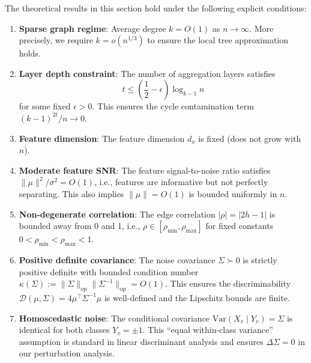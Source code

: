 \begin{assumption}
\label{ass:validity_regime}
The theoretical results in this section hold under the following explicit conditions:
\begin{enumerate}
    \item[(R1)] \textbf{Sparse graph regime}: Average degree $k = O(1)$ as $n \to \infty$. More precisely, we require $k = o(n^{1/3})$ to ensure the local tree approximation holds.

    \item[(R2)] \textbf{Layer depth constraint}: The number of aggregation layers satisfies
    \begin{equation}
        t \leq \left(\frac{1}{2} - \epsilon\right) \log_{k-1} n
    \end{equation}
    for some fixed $\epsilon > 0$. This ensures the cycle contamination term $(k-1)^{2t}/n \to 0$.

    \item[(R3)] \textbf{Feature dimension}: The feature dimension $d_x$ is fixed (does not grow with $n$).

    \item[(R4)] \textbf{Moderate feature SNR}: The feature signal-to-noise ratio satisfies $\|\mu\|^2/\sigma^2 = O(1)$, i.e., features are informative but not perfectly separating. This also implies $\|\mu\| = O(1)$ is bounded uniformly in $n$.

    \item[(R5)] \textbf{Non-degenerate correlation}: The edge correlation $|\rho| = |2h-1|$ is bounded away from 0 and 1, i.e., $\rho \in [\rho_{\min}, \rho_{\max}]$ for fixed constants $0 < \rho_{\min} < \rho_{\max} < 1$.

    \item[(R6)] \textbf{Positive definite covariance}: The noise covariance $\Sigma \succ 0$ is strictly positive definite with bounded condition number $\kappa(\Sigma) := \|\Sigma\|_{\mathrm{op}} \|\Sigma^{-1}\|_{\mathrm{op}} = O(1)$. This ensures the discriminability $\mathcal{D}(\mu, \Sigma) = 4\mu^\top \Sigma^{-1} \mu$ is well-defined and the Lipschitz bounds are finite.

    \item[(R7)] \textbf{Homoscedastic noise}: The conditional covariance $\mathrm{Var}(X_v \mid Y_v) = \Sigma$ is identical for both classes $Y_v = \pm 1$. This ``equal within-class variance'' assumption is standard in linear discriminant analysis and ensures $\Delta\Sigma = 0$ in our perturbation analysis.
\end{enumerate}
\end{assumption}

